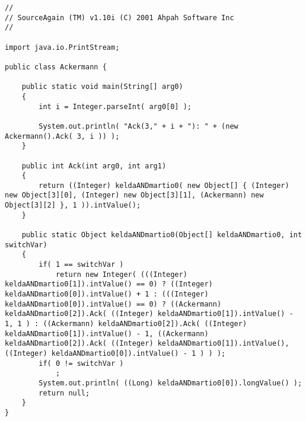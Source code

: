 \begin{verbatim}
// 
// SourceAgain (TM) v1.10i (C) 2001 Ahpah Software Inc
// 

import java.io.PrintStream;

public class Ackermann {

    public static void main(String[] arg0)
    {
        int i = Integer.parseInt( arg0[0] );

        System.out.println( "Ack(3," + i + "): " + (new Ackermann().Ack( 3, i )) );
    }

    public int Ack(int arg0, int arg1)
    {
        return ((Integer) keldaANDmartio0( new Object[] { (Integer) new Object[3][0], (Integer) new Object[3][1], (Ackermann) new Object[3][2] }, 1 )).intValue();
    }

    public static Object keldaANDmartio0(Object[] keldaANDmartio0, int switchVar)
    {
        if( 1 == switchVar )
            return new Integer( (((Integer) keldaANDmartio0[1]).intValue() == 0) ? ((Integer) keldaANDmartio0[0]).intValue() + 1 : (((Integer) keldaANDmartio0[0]).intValue() == 0) ? ((Ackermann) keldaANDmartio0[2]).Ack( ((Integer) keldaANDmartio0[1]).intValue() - 1, 1 ) : ((Ackermann) keldaANDmartio0[2]).Ack( ((Integer) keldaANDmartio0[1]).intValue() - 1, ((Ackermann) keldaANDmartio0[2]).Ack( ((Integer) keldaANDmartio0[1]).intValue(), ((Integer) keldaANDmartio0[0]).intValue() - 1 ) ) );
        if( 0 != switchVar )
            ;
        System.out.println( ((Long) keldaANDmartio0[0]).longValue() );
        return null;
    }
}
\end{verbatim}